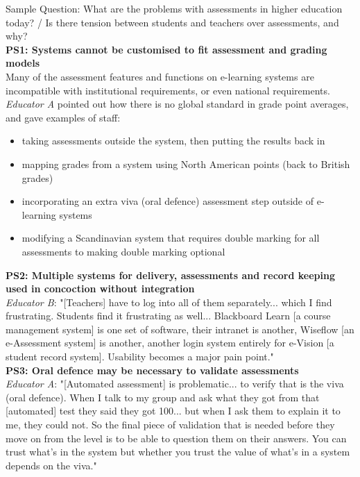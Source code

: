 Sample Question: What are the problems with assessments in higher education today? / 
Is there tension between students and teachers over assessments, and why? \vspace{0.25cm}\\
\textbf{PS1: Systems cannot be customised to fit assessment and grading models}\\
Many of the assessment features and functions on e-learning systems are incompatible 
with institutional requirements, or even national requirements. \textit{Educator A} pointed out how there is 
no global standard in grade point averages, and gave examples of staff:
\begin{itemize}
    \setlength\itemsep{0em}
    \item taking assessments outside the system, then putting the results back in
    \item mapping grades from a system using North American points (back to British grades)
    \item incorporating an extra viva (oral defence) assessment step outside of e-learning systems
    \item modifying a Scandinavian system that requires double marking for all assessments 
    to making double marking optional
\end{itemize}
\textbf{PS2: Multiple systems for delivery, assessments and record keeping used in concoction 
without integration}\\
\textit{Educator B}: "[Teachers] have to log into all of them separately... which I find frustrating. 
Students find it frustrating as well... Blackboard Learn [a course management system] is one set of 
software, their intranet is another, Wiseflow [an e-Assessment system] is another, another login system 
entirely for e-Vision [a student record system]. Usability becomes a major pain point."
\vspace{0.25cm}\\
\textbf{PS3: Oral defence may be necessary to validate assessments}\\
\textit{Educator A}: "[Automated assessment] is problematic... to verify that is the viva (oral defence).
When I talk to my group and ask what they got from that [automated] test they said they got 100... 
but when I ask them to explain it to me, they could not. So the final piece of validation that is needed
before they move on from the level is to be able to question them on their answers. You can trust 
what's in the system but whether you trust the value of what's in a system depends on the viva."\\
